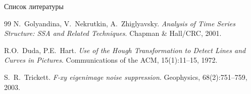 \documentclass[unicode,notheorems]{beamer}
\begin{document}
\begin{frame}{Список литературы}
	\begin{thebibliography}{99}
		 N.~Golyandina, V.~Nekrutkin, A.~Zhiglyavsky.
		\textit{Analysis of Time Series Structure: SSA and Related Techniques}.
		Chapman \& Hall/CRC, 2001.

		 R.O.~Duda, P.E.~Hart.
		\textit{Use of the Hough Transformation to Detect Lines and Curves in Pictures}.
		Communications of the ACM, 15(1):11--15, 1972.

		 S.~R.~Trickett.
		\textit{F-xy eigenimage noise suppression}.
		Geophysics, 68(2):751--759, 2003.
	\end{thebibliography}
\end{frame}
\end{document}
